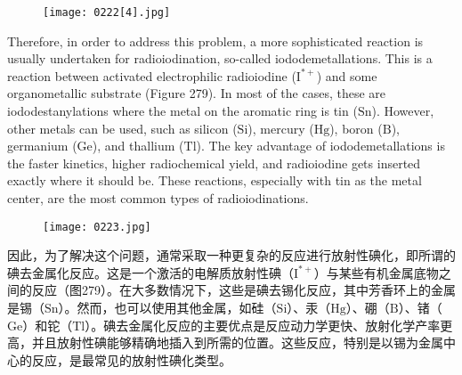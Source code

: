 \documentclass[dvipsnames, svgnames,a4paper,11pt]{article}
\begin{document}
\begin{figure}[h]
	\centering
    \texttt{[image: 0222[4].jpg]}  
     \label{fig278}
\end{figure}


Therefore, in order to address this problem, a more sophisticated reaction is usually undertaken for radioiodination, so-called iododemetallations. This is a reaction between activated electrophilic radioiodine (\(\mathrm{I^{*+}}\)) and some organometallic substrate (Figure 279). In most of the cases, these are iododestanylations where the metal on the aromatic ring is tin (\(\mathrm{Sn}\)). However, other metals can be used, such as silicon (\(\mathrm{Si}\)), mercury (\(\mathrm{Hg}\)), boron (\(\mathrm{B}\)), germanium (\(\mathrm{Ge}\)), and thallium (\(\mathrm{Tl}\)). The key advantage of iododemetallations is the faster kinetics, higher radiochemical yield, and radioiodine gets inserted exactly where it should be. These reactions, especially with tin as the metal center, are the most common types of radioiodinations.

\setcounter{figure}{288}


\begin{figure}[h]
	\centering
    \texttt{[image: 0223.jpg]}  
     \label{fig289}
\end{figure}


因此，为了解决这个问题，通常采取一种更复杂的反应进行放射性碘化，即所谓的碘去金属化反应。这是一个激活的电解质放射性碘（\(\mathrm{I^{*+}}\)）与某些有机金属底物之间的反应（图279）。在大多数情况下，这些是碘去锡化反应，其中芳香环上的金属是锡（\(\mathrm{Sn}\)）。然而，也可以使用其他金属，如硅（\(\mathrm{Si}\)）、汞（\(\mathrm{Hg}\)）、硼（\(\mathrm{B}\)）、锗（\(\mathrm{Ge}\)）和铊（\(\mathrm{Tl}\)）。碘去金属化反应的主要优点是反应动力学更快、放射化学产率更高，并且放射性碘能够精确地插入到所需的位置。这些反应，特别是以锡为金属中心的反应，是最常见的放射性碘化类型。
\end{document}

